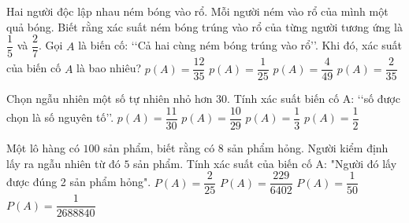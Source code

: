 \begin{ex}
Hai người độc lập nhau ném bóng vào rổ. Mỗi người ném vào rổ của mình một quả bóng. Biết rằng xác suất ném bóng trúng vào rổ của từng người tương ứng là $\dfrac{1}{5}$ và $\dfrac{2}{7}$. Gọi $A$ là biến cố: \lq\lq Cả hai cùng ném bóng trúng vào rổ\rq\rq . Khi đó, xác suất của biến cố $A$ là bao nhiêu?
\choice
{$p(A)=\dfrac{12}{35}$}
{$p(A)=\dfrac{1}{25}$}
{$p(A)=\dfrac{4}{49}$}
{\True $p(A)=\dfrac{2}{35}$}
\end{ex}
\begin{ex}
Chọn ngẫu nhiên một số tự nhiên nhỏ hơn 30. Tính xác suất biến cố A: \lq\lq số được chọn là số nguyên tố\rq\rq .
\choice
{$p(A)=\dfrac{11}{30}$}
{$p(A)=\dfrac{10}{29}$}
{\True $p(A)=\dfrac{1}{3}$}
{$p(A)=\dfrac{1}{2}$}
\end{ex}
\begin{ex}
Một lô hàng có $100$ sản phẩm, biết rằng có $8$ sản phẩm hỏng. Người kiểm định lấy ra ngẫu nhiên từ đó $5$ sản phẩm. Tính xác suất của biến cố A: "Người đó lấy được đúng 2 sản phẩm hỏng".
\choice
{$P(A)=\dfrac{2}{25}$}
{\True $P(A)=\dfrac{229}{6402}$}
{$P(A)=\dfrac{1}{50}$}
{$P(A)=\dfrac{1}{2688840}$}
\end{ex}
